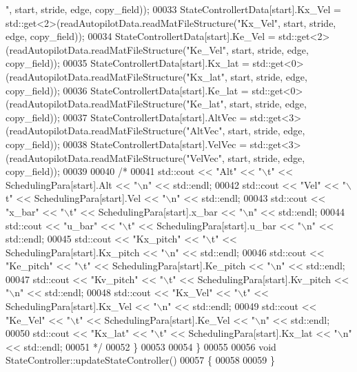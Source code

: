 \begin{DoxyCode}
{      "}, start, stride, edge, copy\_field));
00033         StateControllertData[start].Kx\_Vel = std::get<2>(readAutopilotData.readMatFileStructure(\textcolor{stringliteral}{"Kx\_Vel"}, 
      start, stride, edge, copy\_field));
00034         StateControllertData[start].Ke\_Vel = std::get<2>(readAutopilotData.readMatFileStructure(\textcolor{stringliteral}{"Ke\_Vel"}, 
      start, stride, edge, copy\_field));
00035         StateControllertData[start].Kx\_lat = std::get<0>(readAutopilotData.readMatFileStructure(\textcolor{stringliteral}{"Kx\_lat"}, 
      start, stride, edge, copy\_field));
00036         StateControllertData[start].Ke\_lat = std::get<0>(readAutopilotData.readMatFileStructure(\textcolor{stringliteral}{"Ke\_lat"}, 
      start, stride, edge, copy\_field));
00037         StateControllertData[start].AltVec = std::get<3>(readAutopilotData.readMatFileStructure(\textcolor{stringliteral}{"AltVec"}, 
      start, stride, edge, copy\_field));
00038         StateControllertData[start].VelVec = std::get<3>(readAutopilotData.readMatFileStructure(\textcolor{stringliteral}{"VelVec"}, 
      start, stride, edge, copy\_field));
00039 
00040         \textcolor{comment}{/*}
00041 \textcolor{comment}{        std::cout << "Alt" << "\(\backslash\)t" << SchedulingPara[start].Alt << "\(\backslash\)n" << std::endl;}
00042 \textcolor{comment}{        std::cout << "Vel" << "\(\backslash\)t" << SchedulingPara[start].Vel << "\(\backslash\)n" << std::endl;}
00043 \textcolor{comment}{        std::cout << "x\_bar" << "\(\backslash\)t" << SchedulingPara[start].x\_bar << "\(\backslash\)n" << std::endl;}
00044 \textcolor{comment}{        std::cout << "u\_bar" << "\(\backslash\)t" << SchedulingPara[start].u\_bar << "\(\backslash\)n" << std::endl;}
00045 \textcolor{comment}{        std::cout << "Kx\_pitch" << "\(\backslash\)t" << SchedulingPara[start].Kx\_pitch << "\(\backslash\)n" << std::endl;}
00046 \textcolor{comment}{        std::cout << "Ke\_pitch" << "\(\backslash\)t" << SchedulingPara[start].Ke\_pitch << "\(\backslash\)n" << std::endl;}
00047 \textcolor{comment}{        std::cout << "Kv\_pitch" << "\(\backslash\)t" << SchedulingPara[start].Kv\_pitch << "\(\backslash\)n" << std::endl;}
00048 \textcolor{comment}{        std::cout << "Kx\_Vel" << "\(\backslash\)t" << SchedulingPara[start].Kx\_Vel << "\(\backslash\)n" << std::endl;}
00049 \textcolor{comment}{        std::cout << "Ke\_Vel" << "\(\backslash\)t" << SchedulingPara[start].Ke\_Vel << "\(\backslash\)n" << std::endl;}
00050 \textcolor{comment}{        std::cout << "Kx\_lat" << "\(\backslash\)t" << SchedulingPara[start].Kx\_lat << "\(\backslash\)n" << std::endl;}
00051 \textcolor{comment}{        */}
00052     \}
00053     
00054 \}
00055 
00056 \textcolor{keywordtype}{void} StateController::updateStateController()
00057 \{
00058     
00059 \}
\end{DoxyCode}
